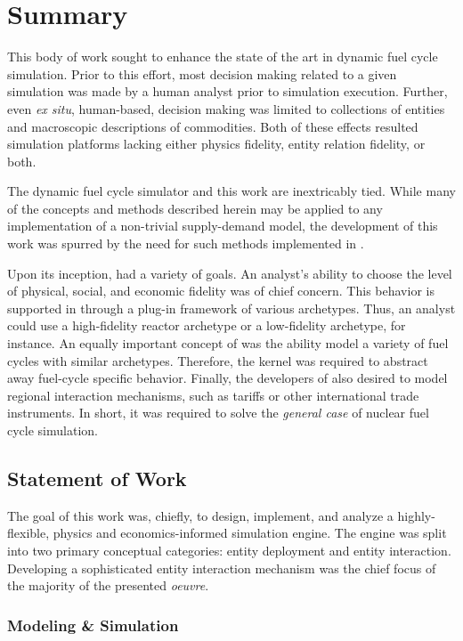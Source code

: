 \chapter{Summary}\label{ch:summary}

This body of work sought to enhance the state of the art in dynamic fuel cycle
simulation. Prior to this effort, most decision making related to a given
simulation was made by a human analyst prior to simulation execution. Further,
even \textit{ex situ}, human-based, decision making was limited to collections
of entities and macroscopic descriptions of commodities. Both of these effects
resulted simulation platforms lacking either physics fidelity, entity relation
fidelity, or both.

The \Cyclus dynamic fuel cycle simulator and this work are inextricably
tied. While many of the concepts and methods described herein may be applied to
any implementation of a non-trivial supply-demand model, the development of this
work was spurred by the need for such methods implemented in \Cyclus. 

Upon its inception, \Cyclus had a variety of goals. An analyst's ability to
choose the level of physical, social, and economic fidelity was of chief
concern. This behavior is supported in \Cyclus through a plug-in framework of
various archetypes. Thus, an analyst could use a high-fidelity reactor archetype
or a low-fidelity archetype, for instance. An equally important concept of
\Cyclus was the ability model a variety of fuel cycles with similar
archetypes. Therefore, the \Cyclus kernel was required to abstract away
fuel-cycle specific behavior. Finally, the developers of \Cyclus also desired to
model regional interaction mechanisms, such as tariffs or other international
trade instruments. In short, it was required to solve the \textit{general case}
of nuclear fuel cycle simulation.

\section{Statement of Work}

The goal of this work was, chiefly, to design, implement, and analyze a
highly-flexible, physics and economics-informed simulation engine. The engine
was split into two primary conceptual categories: entity deployment and entity
interaction. Developing a sophisticated entity interaction mechanism was the
chief focus of the majority of the presented \textit{oeuvre}.

\subsection{Modeling \& Simulation}

